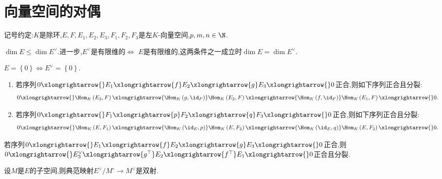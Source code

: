 \section{向量空间的对偶}

记号约定:$K$是除环,$E,F,E_{1},E_{2},E_{3},F_{1},F_{2},F_{3}$是左$K$-向量空间,$p,m,n\in\N$.

\begin{theorem}{}{}
	$\dim E\leq\dim E^{\vee}$.进一步,$E^{\vee}$是有限维的$\iff$ $E$是有限维的,这两条件之一成立时$\dim E=\dim E^{\vee}$.
\end{theorem}

\begin{corollary}{}{}
	$E=\left\{0\right\}\iff E^{\vee}=\left\{0\right\}$.
\end{corollary}

\begin{theorem}{}{}
	\begin{enumerate}
		\item 若序列$0\xlongrightarrow{}E_{1}\xlongrightarrow{f}E_{2}\xlongrightarrow{g}E_{3}\xlongrightarrow{}0$正合,则如下序列正合且分裂:
		\begin{align*}
			0\xlongrightarrow{}\Hom_{K}\left(E_{3},F\right)\xlongrightarrow{\Hom_{K}\left(g,\id_{F}\right)}\Hom_{K}\left(E_{2},F\right)\xlongrightarrow{\Hom_{K}\left(f,\id_{F}\right)}\Hom_{K}\left(E_{1},F\right)\xlongrightarrow{}0.
		\end{align*}
		\item 若序列$0\xlongrightarrow{}F_{1}\xlongrightarrow{p}F_{2}\xlongrightarrow{q}F_{3}\xlongrightarrow{}0$正合,则如下序列正合且分裂:
		\begin{align*}
			0\xlongrightarrow{}\Hom_{K}\left(E,F_{1}\right)\xlongrightarrow{\Hom_{K}\left(\id_{E},p\right)}\Hom_{K}\left(E,F_{2}\right)\xlongrightarrow{\Hom_{K}\left(\id_{E},q\right)}\Hom_{K}\left(E,F_{3}\right)\xlongrightarrow{}0.
		\end{align*}
	\end{enumerate}
\end{theorem}

\begin{corollary}{}{}
	若序列$0\xlongrightarrow{}E_{1}\xlongrightarrow{f}E_{2}\xlongrightarrow{g}E_{3}\xlongrightarrow{}0$正合,则$0\xlongrightarrow{}E_{3}^{\vee}\xlongrightarrow{g^{\top}}E_{2}\xlongrightarrow{f^{\top}}E_{1}\xlongrightarrow{}0$正合且分裂.
\end{corollary}

\begin{corollary}{}{}
	设$M$是$E$的子空间,则典范映射$E^{\vee}/M^{\circ}\to M^{\vee}$是双射.
\end{corollary}

